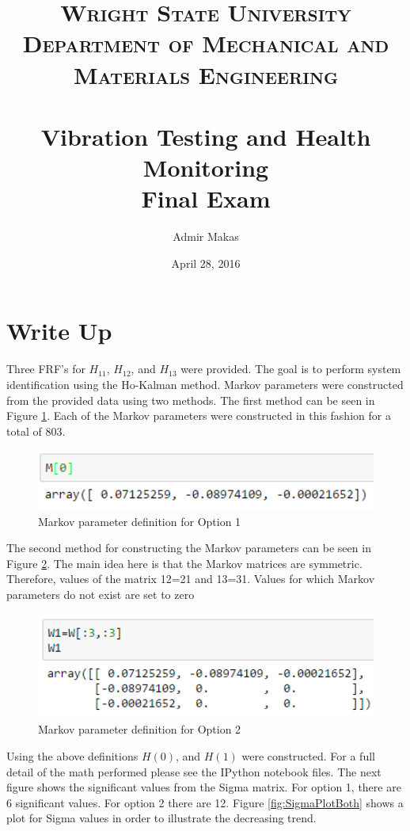 \documentclass[paper=a4, fontsize=12pt]{scrartcl} %
\title{	
\normalfont \normalsize 
\textsc{Wright State University\\ Department of Mechanical and Materials Engineering} \\ [25pt] %
\horrule{0.5pt} \\[0.4cm] %
\huge Vibration Testing and Health Monitoring \\ %
\Large Final Exam
\horrule{2pt} \\[0.5cm] %
}
\author{Admir Makas} %
\date{\normalsize April 28, 2016} %
\begin{document}
\maketitle %

\section*{Write Up}
Three FRF's for $H_{11}$, $H_{12}$, and $H_{13}$ were provided. The goal is to perform system identification using the Ho-Kalman method. Markov parameters were constructed from the provided data using two methods. The first method can be seen in Figure \ref{fig:M1}. Each of the Markov parameters were constructed in this fashion for a total of 803.
%
\begin{figure}[H]
	\centering
	\includegraphics[height = 2.0cm]{M1.png}
	\caption{Markov parameter definition for Option 1}
	\label{fig:M1}
\end{figure}
%
The second method for constructing the Markov parameters can be seen in Figure \ref{fig:M2}. The main idea here is that the Markov matrices are symmetric. Therefore, values of the matrix 12=21 and 13=31. Values for which Markov parameters do not exist are set to zero
%
\begin{figure}[H]
	\centering
	\includegraphics[height = 3.5cm]{M2.png}
	\caption{Markov parameter definition for Option 2}
	\label{fig:M2}
\end{figure}
%
Using the above definitions $H(0)$, and $H(1)$ were constructed. For a full detail of the math performed please see the IPython notebook files. The next figure shows the significant values from the Sigma matrix. For option 1, there are 6 significant values. For option 2 there are 12. Figure \ref{fig:SigmaPlotBoth} shows a plot for Sigma values in order to illustrate the decreasing trend.
\end{document}
